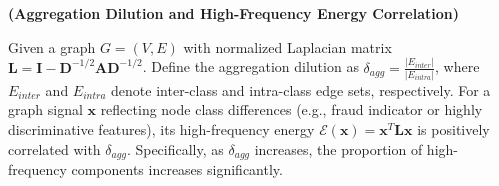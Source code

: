 
\begin{theorem}
\label{thm:delta_high_freq}
\textbf{(Aggregation Dilution and High-Frequency Energy Correlation)}

Given a graph $G=(V, E)$ with normalized Laplacian matrix $\mathbf{L} = \mathbf{I} - \mathbf{D}^{-1/2}\mathbf{A}\mathbf{D}^{-1/2}$. Define the aggregation dilution as $\delta_{agg} = \frac{|E_{inter}|}{|E_{intra}|}$, where $E_{inter}$ and $E_{intra}$ denote inter-class and intra-class edge sets, respectively.
For a graph signal $\mathbf{x}$ reflecting node class differences (e.g., fraud indicator or highly discriminative features), its high-frequency energy $\mathcal{E}(\mathbf{x}) = \mathbf{x}^T \mathbf{L} \mathbf{x}$ is positively correlated with $\delta_{agg}$. Specifically, as $\delta_{agg}$ increases, the proportion of high-frequency components increases significantly.
\end{theorem}


